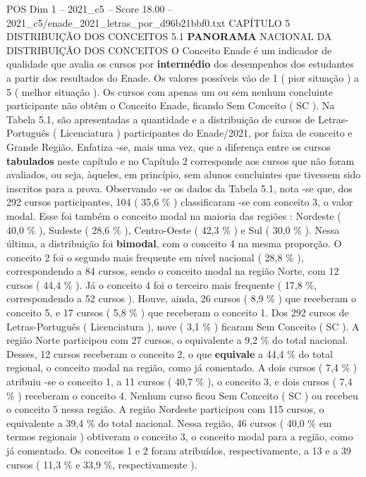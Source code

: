\begin{textsample}{POS Dim 1 – 2021\_c5 – Score 18.00 – 2021\_c5/enade\_2021\_letras\_por\_d96b21bbf0.txt}  \label{ex:f1_pos_040}
CAPÍTULO 5 DISTRIBUIÇÃO DOS CONCEITOS 5.1 \textbf{PANORAMA} NACIONAL DA DISTRIBUIÇÃO DOS CONCEITOS O Conceito Enade é um indicador de qualidade que avalia os cursos por \textbf{intermédio} dos desempenhos dos estudantes a partir dos resultados do Enade.
Os valores possíveis vão de 1 ( pior situação ) a 5 ( melhor situação ).
Os cursos com apenas um ou sem nenhum concluinte participante não obtêm o Conceito Enade, ficando Sem Conceito ( SC ).
Na Tabela 5.1, são apresentadas a quantidade e a distribuição de cursos de Letras-Português ( Licenciatura ) participantes do Enade/2021, por faixa de conceito e Grande Região.
Enfatiza -se, mais uma vez, que a diferença entre os cursos \textbf{tabulados} neste capítulo e no Capítulo 2 corresponde aos cursos que não foram avaliados, ou seja, àqueles, em princípio, sem alunos concluintes que tivessem sido inscritos para a prova.
Observando -se os dados da Tabela 5.1, nota -se que, dos 292 cursos participantes, 104 ( 35,6 \% ) classificaram -se com conceito 3, o valor modal.
Esse foi também o conceito modal na maioria das regiões : Nordeste ( 40,0 \% ), Sudeste ( 28,6 \% ), Centro-Oeste ( 42,3 \% ) e Sul ( 30,0 \% ).
Nessa última, a distribuição foi \textbf{bimodal}, com o conceito 4 na mesma proporção.
O conceito 2 foi o segundo mais frequente em nível nacional ( 28,8 \% ), correspondendo a 84 cursos, sendo o conceito modal na região Norte, com 12 cursos ( 44,4 \% ).
Já o conceito 4 foi o terceiro mais frequente ( 17,8 \%, correspondendo a 52 cursos ).
Houve, ainda, 26 cursos ( 8,9 \% ) que receberam o conceito 5, e 17 cursos ( 5,8 \% ) que receberam o conceito 1.
Dos 292 cursos de Letras-Português ( Licenciatura ), nove ( 3,1 \% ) ficaram Sem Conceito ( SC ).
A região Norte participou com 27 cursos, o equivalente a 9,2 \% do total nacional.
Desses, 12 cursos receberam o conceito 2, o que \textbf{equivale} a 44,4 \% do total regional, o conceito modal na região, como já comentado.
A dois cursos ( 7,4 \% ) atribuiu -se o conceito 1, a 11 cursos ( 40,7 \% ), o conceito 3, e dois cursos ( 7,4 \% ) receberam o conceito 4.
Nenhum curso ficou Sem Conceito ( SC ) ou recebeu o conceito 5 nessa região.
A região Nordeste participou com 115 cursos, o equivalente a 39,4 \% do total nacional.
Nessa região, 46 cursos ( 40,0 \% em termos regionais ) obtiveram o conceito 3, o conceito modal para a região, como já comentado.
Os conceitos 1 e 2 foram atribuídos, respectivamente, a 13 e a 39 cursos ( 11,3 \% e 33,9 \%, respectivamente ).

\end{textsample}
